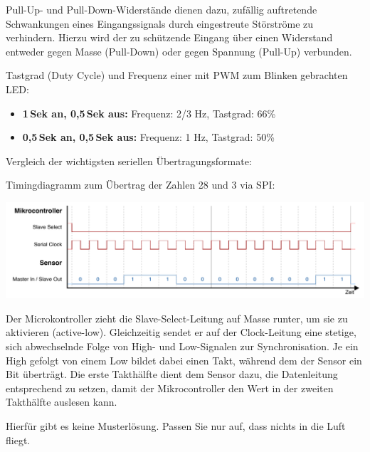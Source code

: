 \bigskip
\teilaufgabe
Pull-Up- und Pull-Down-Widerstände dienen dazu, zufällig auftretende Schwankungen
eines Eingangssignals durch eingestreute Störströme zu verhindern. Hierzu wird
der zu schützende Eingang über einen Widerstand entweder gegen Masse (Pull-Down)
oder gegen Spannung (Pull-Up) verbunden.

\bigskip
\teilaufgabe
Tastgrad (Duty Cycle) und Frequenz einer mit PWM zum Blinken gebrachten LED:

\begin{itemize}
    \item \textbf{1\,Sek an, 0,5\,Sek aus:}
    Frequenz: 2/3 Hz, Tastgrad: 66\%

    \item \textbf{0,5\,Sek an, 0,5\,Sek aus:}
    Frequenz: 1 Hz, Tastgrad: 50\%
\end{itemize}

\clearpage

\teilaufgabe
Vergleich der wichtigsten seriellen Übertragungsformate:


\bigskip
\teilaufgabe
Timingdiagramm zum Übertrag der Zahlen 28 und 3 via SPI:

\includegraphics[width=\textwidth]{2-hardwaredesign/img/spi_timingdiagramm}

{
    \small
    Der Microkontroller zieht die Slave-Select-Leitung auf Masse runter, um sie
    zu aktivieren (active-low). Gleichzeitig sendet er auf der Clock-Leitung eine
    stetige, sich abwechselnde Folge von High- und Low-Signalen zur Synchronisation.
    Je ein High gefolgt von einem Low bildet dabei einen Takt, während dem der
    Sensor ein Bit überträgt. Die erste Takthälfte dient dem Sensor dazu, die
    Datenleitung entsprechend zu setzen, damit der Mikrocontroller den Wert in
    der zweiten Takthälfte auslesen kann.
}

Hierfür gibt es keine Musterlösung. Passen Sie nur auf, dass nichts in die
Luft fliegt. \smiley
